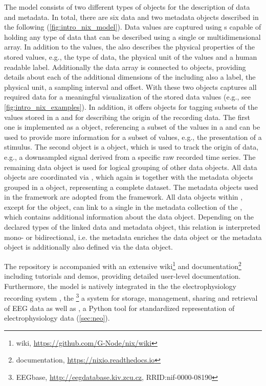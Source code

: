 The  model consists of two different types of objects for the description of data and metadata. In total, there are six data and two metadata objects  described in the following (\cref{fig:intro_nix_model}).
Data values are captured using s capable of holding any type of data that can be described using a single or multidimensional array. In addition to the values, the  also describes the physical properties of the stored values, e.g., the type of data, the physical unit of the values and a human readable label. Additionally the data array is connected to  objects, providing details about each of the additional dimensions of the  including also a label, the physical unit, a sampling interval and offset. With these two objects  captures all required data for a meaningful visualization of the stored data values (e.g., see \cref{fig:intro_nix_examples}). In addition, it offers objects for tagging subsets of the values stored in a  and for describing the origin of the recording data. The first one is implemented as a  object, referencing a subset of the values in a  and can be used to provide more information for a subset of values, e.g., the presentation of a stimulus. The second object is a  object, which is used to track the origin of data, e.g., a downsampled signal derived from a specific raw recorded time series. The remaining data object  is used for logical grouping of other  data objects. All data objects are coordinated via , which again is together with the metadata objects grouped in a   object, representing a complete dataset.
The metadata objects used in the  framework are adopted from the  framework. All data objects within , except for the  object, can link to a single  in the metadata collection of the  , which contains additional information about the data object. Depending on the declared types of the linked data and metadata object, this relation is interpreted mono- or bidirectional, i.e. the metadata  enriches the data object or the metadata object is additionally also defined via the data object.

The  repository is accompanied with an extensive wiki\footnote{ wiki, \url{https://github.com/G-Node/nix/wiki}} and documentation\footnote{ documentation, \url{https://nixio.readthedocs.io}} including tutorials and demos, providing detailed user-level documentation. Furthermore, the  model is natively integrated in the the electrophysiology recording system , the \footnote{EEGbase, \url{http://eegdatabase.kiv.zcu.cz}, RRID:nif-0000-08190} a system for storage, management, sharing and retrieval of EEG data as well as , a Python tool for standardized representation of electrophysiology data (\cref{sec:neo}).


